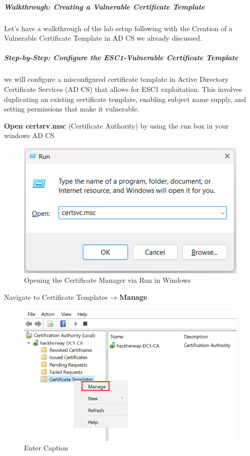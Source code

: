 \subparagraph{\textbf{Walkthrough: Creating a Vulnerable Certificate Template}}

Let’s have a walkthrough of the lab setup following with the Creation of a Vulnerable Certificate Template in AD CS we already discussed.

\subparagraph{\textbf{Step-by-Step: Configure the ESC1-Vulnerable Certificate Template}}

we will configure a misconfigured certificate template in Active Directory Certificate Services (AD CS) that allows for ESC1 exploitation. This involves duplicating an existing certificate template, enabling subject name supply, and setting permissions that make it vulnerable.

\textbf{Open certsrv.msc} (Certificate Authority) by using the run box in your windows AD CS

\begin{figure}
    \centering
    \includegraphics[width=0.75\linewidth]{certsvc.png}
    \caption{Opening the Certificate Manager via Run in Windows}
    \label{fig:placeholder}
\end{figure}

Navigate to Certificate Templates → \textbf{Manage}

\begin{figure}
    \centering
    \includegraphics[width=0.85\linewidth]{cammc.png}
    \caption{Enter Caption}
    \label{fig:placeholder}
\end{figure}

